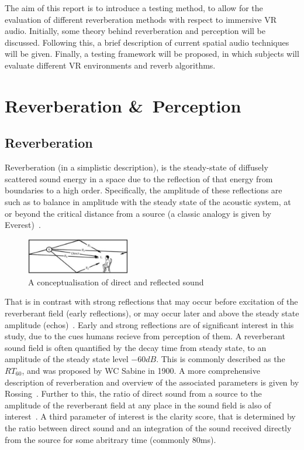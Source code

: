 \documentclass[paper=a4, fontsize=10pt, font=arial]{scrartcl} %
\numberwithin{equation}{section} %
\numberwithin{figure}{section} %
\numberwithin{table}{section} %
\begin{document}
The aim of this report is to introduce a testing method, to allow for the evaluation of different reverberation methods with respect to immersive VR audio. 
Initially, some theory behind reverberation and perception will be discussed. Following this, a brief description of current spatial audio techniques will be given. 
Finally, a testing framework will be proposed, in which subjects will evaluate different VR environments and reverb algorithms.


\newpage
\section{Reverberation \&\ Perception}
\subsection{Reverberation}

Reverberation (in a simplistic description), is the steady-state of diffusely scattered sound energy in a space due to the reflection of that energy from boundaries to a high order. Specifically, the amplitude of these reflections are such as to balance in amplitude with the steady state of the acoustic system, at or beyond the critical distance from a source (a classic analogy is given by Everest)~\cite{Everest2009}. 

\begin{figure}[H]
\centering
\includegraphics[width=0.4\textwidth]{reflection_diagran.jpg}
\centering
\caption{A conceptualisation of direct and reflected sound~\cite{Everest2009}}
\end{figure}

That is in contrast with strong reflections that may occur before excitation of the reverberant field (early reflections), or may occur later and above the steady state amplitude (echos)~\cite{Everest2009}. Early and strong reflections are of significant interest in this study, due to the cues humans recieve from perception of them. A reverberant sound field is often quantified by the decay time from steady state, to an amplitude of the steady state level $-60{dB}$. This is commonly described as the $RT_{60}$, and was proposed by WC Sabine in 1900. A more comprehensive description of reverberation and overview of the associated parameters is given by Rossing~\cite{rossing2007springer}. Further to this, the ratio of direct sound from a source to the amplitude of the reverberant field at any place in the sound field is also of interest~\cite{Begault1995}. A third parameter of interest is the clarity score, that is determined by the ratio between direct sound and an integration of the sound received directly from the source for some abritrary time (commonly 80ms). 
\end{document}
